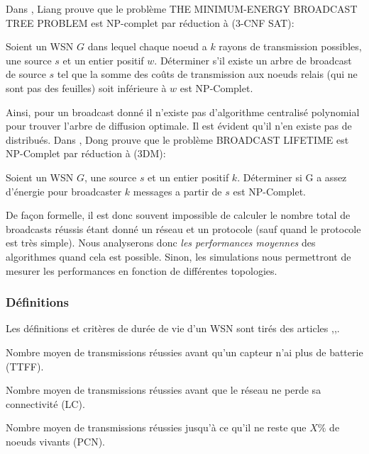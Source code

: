 Dans \cite{Liang2002}, Liang prouve que le  problème THE MINIMUM-ENERGY BROADCAST
TREE PROBLEM est NP-complet par réduction à (3-CNF SAT):
\begin{myth}
Soient un WSN $G$ dans lequel chaque noeud a $k$ rayons de transmission possibles, une source $s$ et un entier positif $w$.
Déterminer s'il existe un arbre de broadcast de source $s$ tel que la somme des coûts de transmission aux noeuds relais (qui ne sont pas des feuilles) soit inférieure à $w$ est NP-Complet.
\end{myth}
Ainsi, pour un broadcast donné il n'existe pas d'algorithme centralisé polynomial pour trouver l'arbre de diffusion optimale. Il est évident qu'il n'en existe pas de distribués. 
Dans \cite{Dong2005}, Dong prouve que le  problème BROADCAST LIFETIME est NP-Complet par réduction à (3DM):
\begin{myth}
Soient un WSN $G$, une source $s$ et un entier positif $k$.
Déterminer si G a assez d'énergie pour broadcaster $k$ messages a partir de $s$ est NP-Complet.
\end{myth}

De façon formelle, il est donc souvent impossible de calculer le nombre total de broadcasts réussis étant donné un réseau et un protocole (sauf quand le protocole est très simple). Nous analyserons donc \textit{les performances moyennes} des algorithmes quand cela est possible. Sinon, les simulations nous permettront de mesurer les performances en fonction de différentes topologies.

\subsubsection{Définitions}
Les définitions et critères de durée de vie d'un WSN sont tirés des articles \cite{Dietrich2009},\cite{Champ2009lifetime},\cite{Elleithy2011}. 

\begin{mylt}\label{TTFF}
Nombre moyen de transmissions réussies avant qu'un capteur n'ai plus de batterie (TTFF).
\end{mylt}
\begin{mylt}\label{LC}
Nombre moyen de transmissions réussies avant que le réseau ne perde sa connectivité (LC).
\end{mylt}
\begin{mylt}\label{PCN}
Nombre moyen de transmissions réussies jusqu'à ce qu'il ne reste que $X\%$ de noeuds vivants (PCN).
\end{mylt}



